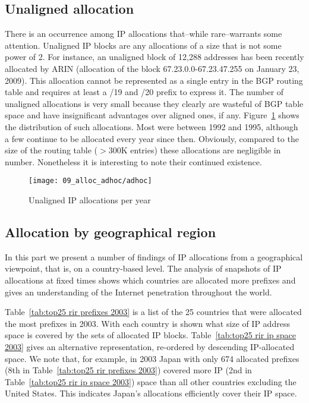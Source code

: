 \subsection{Unaligned allocation}

There is an occurrence among IP allocations that--while rare--warrants some
attention. Unaligned IP blocks are any allocations of a size that is not some
power of 2. For instance, an unaligned block of 12,288 addresses has been
recently allocated by ARIN (allocation of the block 67.23.0.0-67.23.47.255 on
January 23, 2009). This allocation cannot be represented as a single entry in
the BGP routing table and requires at least a /19 and /20 prefix to express it.
The number of unaligned allocations is very small because they clearly are
wasteful of BGP table space and have insignificant advantages over aligned
ones, if any. Figure~\ref{fig:unaligned IP allocations} shows the distribution
of such allocations. Most were between 1992 and 1995, although a few continue
to be allocated every year since then. Obviously, compared to the size of the
routing table ($>$300K entries) these allocations are negligible in number.
Nonetheless it is interesting to note their continued existence.

\begin{figure}[htbp]
 	\centering
 		\texttt{[image: 09\_alloc\_adhoc/adhoc]}
	\caption{Unaligned IP allocations per year}
 	\label{fig:unaligned IP allocations}
\end{figure}

\subsection{Allocation by geographical region}




In this part we present a number of findings of IP allocations from a 
geographical viewpoint, that is, on a country-based level. The analysis of 
snapshots of IP allocations at fixed times shows which countries are 
allocated more prefixes and gives an understanding of the Internet penetration 
throughout the world.

Table~\ref{tab:top25 rir prefixes 2003} is a list of the 25 countries that 
were allocated the most prefixes in 2003.  With each country is shown what 
size of IP address space is covered by the sets of allocated IP blocks.
Table~\ref{tab:top25 rir ip space 2003} gives an alternative representation, 
re-ordered by descending IP-allocated space.  We note that, for example, 
in 2003 Japan with only 674 allocated prefixes (8th in 
Table~\ref{tab:top25 rir prefixes 2003}) covered more IP (2nd in 
Table~\ref{tab:top25 rir ip space 2003}) space than all other countries 
excluding the United States.  This indicates Japan's allocations efficiently 
cover their IP space.

